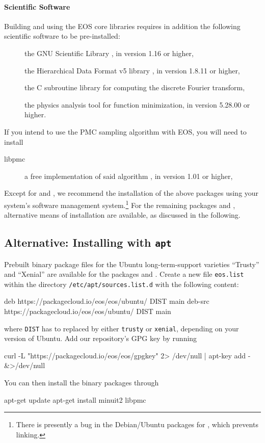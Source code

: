 \paragraph{Scientific Software} Building and using the EOS core libraries requires in addition
the following scientific software to be pre-installed:
\begin{description}
    \item[] the GNU Scientific Library \cite{GSL}, in version 1.16 or higher,
    \item[] the Hierarchical Data Format v5 library \cite{HDF5}, in version 1.8.11 or higher,
    \item[] the C subroutine library for computing the discrete Fourier transform,
    \item[] the physics analysis tool for function minimization, in version 5.28.00 or higher.
\end{description}
If you intend to use the \gls{PMC} sampling algorithm with EOS, you will need to install
\begin{description}
    \item[libpmc] a free implementation of said algorithm \cite{libpmc}, in version 1.01 or higher,
\end{description}

Except for  and , we recommend the installation of the above packages
using your system's software management system.\footnote{%
    There is presently a bug in the Debian/Ubuntu packages for , which prevents
    linking.
}
For the remaining packages  and , alternative means of installation
are available, as discussed in the following.

\subsection{Alternative: Installing with \texttt{apt}}

Prebuilt binary package files for the Ubuntu long-term-support varieties
``Trusty'' and ``Xenial'' are available for the packages  and
. Create a new file \texttt{eos.list} within the directory
\texttt{/etc/apt/sources.list.d} with the following content:
\begin{file}
deb https://packagecloud.io/eos/eos/ubuntu/ DIST main
deb-src https://packagecloud.io/eos/eos/ubuntu/ DIST main
\end{file}
where \texttt{DIST} has to replaced by either \texttt{trusty} or
\texttt{xenial}, depending on your version of Ubuntu. Add our repository's
GPG key by running
\begin{commandline}
curl -L "https://packagecloud.io/eos/eos/gpgkey" 2> /dev/null | apt-key add - &>/dev/null
\end{commandline}
You can then install the binary packages through
\begin{commandline}
apt-get update
apt-get install minuit2 libpmc
\end{commandline}

